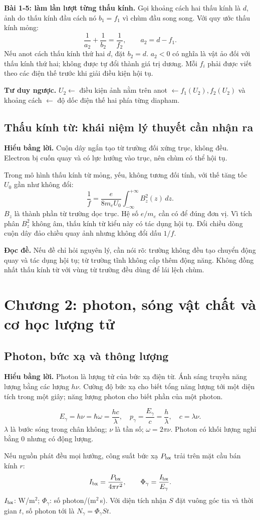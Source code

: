 \documentclass[11pt,a4paper]{article}
\newcommand{\idea}[1]{\par\textbf{Hiểu bằng lời.} #1\par}
\newcommand{\readit}[1]{\par\textbf{Đọc đề.} #1\par}
\newcommand{\think}[1]{\par\textbf{Tư duy ngược.} #1\par}
\newcommand{\chap}[1]{\par\section{#1}}
\begin{document}
\textbf{Bài 1-5: làm lần lượt từng thấu kính.}
Gọi khoảng cách hai thấu kính là $d$, ảnh do thấu kính đầu cách nó
$b_1=f_1$ vì chùm đầu song song. Với quy ước thấu kính mỏng:
\[
\frac1{a_2}+\frac1{b_2}=\frac1{f_2},\qquad
a_2=d-f_1.
\]
Nếu anot cách thấu kính thứ hai $d$, đặt $b_2=d$.
$a_2<0$ có nghĩa là vật ảo đối với thấu kính thứ hai; không được tự đổi thành
giá trị dương. Mỗi $f_i$ phải được viết theo các điện thế trước khi giải điều kiện hội tụ.

\think{$U_2\leftarrow$ điều kiện ảnh nằm trên anot
$\leftarrow f_1(U_2),f_2(U_2)$ và khoảng cách
$\leftarrow$ độ dốc điện thế hai phía từng diapham.}

\subsection{Thấu kính từ: khái niệm lý thuyết cần nhận ra}\label{sec:maglens}
\idea{Cuộn dây ngắn tạo từ trường đối xứng trục, không đều.
Electron bị cuốn quay và có lực hướng vào trục, nên chùm có thể hội tụ.}
Trong mô hình thấu kính từ mỏng, yếu, không tương đối tính, với thế tăng tốc
$U_0$ gần như không đổi:
\[
\frac1f=\frac{e}{8m_eU_0}\int_{-\infty}^{+\infty}B_z^2(z)\,dz.
\]
$B_z$ là thành phần từ trường dọc trục. Hệ số $e/m_e$ cần có để đúng đơn vị.
Vì tích phân $B_z^2$ không âm, thấu kính từ kiểu này có tác dụng hội tụ.
Đổi chiều dòng cuộn dây đảo chiều quay ảnh nhưng không đổi dấu $1/f$.

\readit{Nếu đề chỉ hỏi nguyên lý, cần nói rõ: trường không đều tạo chuyển động
quay và tác dụng hội tụ; từ trường tĩnh không cấp thêm động năng.
Không đồng nhất thấu kính từ với vùng từ trường đều dùng để lái lệch chùm.}

\chap{Chương 2: photon, sóng vật chất và cơ học lượng tử}
\subsection{Photon, bức xạ và thông lượng}\label{sec:photon}
\idea{Photon là lượng tử của bức xạ điện từ. Ánh sáng truyền năng lượng
bằng các lượng $h\nu$. Cường độ bức xạ cho biết tổng năng lượng tới một diện
tích trong một giây; năng lượng photon cho biết phần của một photon.}
\[
E_\gamma=h\nu=\hbar\omega=\frac{hc}{\lambda},\quad
p_\gamma=\frac{E_\gamma}{c}=\frac h\lambda,\quad
c=\lambda\nu.
\]
$\lambda$ là bước sóng trong chân không; $\nu$ là tần số;
$\omega=2\pi\nu$. Photon có khối lượng nghỉ bằng 0 nhưng có động lượng.

Nếu nguồn phát đều mọi hướng, công suất bức xạ $P_{\rm bx}$ trải trên
mặt cầu bán kính $r$:
\[
I_{\rm bx}=\frac{P_{\rm bx}}{4\pi r^2},\qquad
\Phi_\gamma=\frac{I_{\rm bx}}{E_\gamma}.
\]
$I_{\rm bx}$: W/m$^2$; $\Phi_\gamma$: số photon/(m$^2$\,s).
Với diện tích nhận $S$ đặt vuông góc tia và thời gian $t$,
số photon tới là $N_\gamma=\Phi_\gamma St$.
\end{document}
